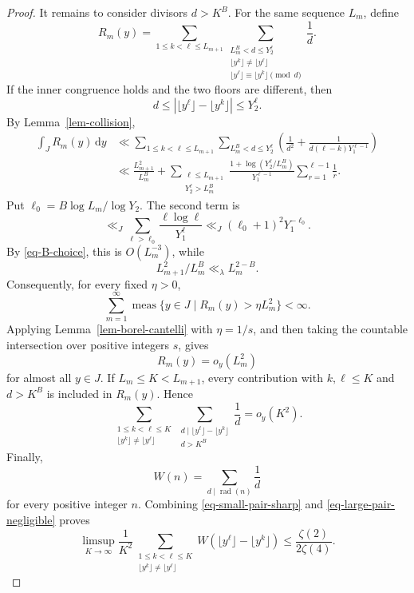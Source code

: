 \documentclass[10pt,a4paper]{amsart}
\begin{document}
\begin{proof}
        It remains to consider divisors $d>K^B$. For the same sequence $L_m$, define
        $$
        R_m(y)=\sum_{1\le k<\ell\le L_{m+1}}
        \sum_{\substack{L_m^B<d\le Y_2^\ell\\
                \lfloor y^k\rfloor\ne\lfloor y^\ell\rfloor\\
                \lfloor y^\ell\rfloor\equiv\lfloor y^k\rfloor\pmod d}}
        \frac1d.
        $$
        If the inner congruence holds and the two floors are different, then
        $$
        d\le \left|\lfloor y^\ell\rfloor-\lfloor y^k\rfloor\right|\le Y_2^\ell.
        $$
        By Lemma~\ref{lem-collision},
        \begin{align*}
            \int_J R_m(y)\,\mathrm{d}y
            &\ll \sum_{1\le k<\ell\le L_{m+1}}
            \sum_{L_m^B<d\le Y_2^\ell}
            \left(\frac1{d^2}+\frac1{d(\ell-k)Y_1^{\ell-1}}\right)\\
            &\ll \frac{L_{m+1}^2}{L_m^B}
            +\sum_{\substack{\ell\le L_{m+1}\\Y_2^\ell>L_m^B}}
            \frac{1+\log(Y_2^\ell/L_m^B)}{Y_1^{\ell-1}}
            \sum_{r=1}^{\ell-1}\frac1r.
        \end{align*}
        Put $\ell_0=B\log L_m/\log Y_2$. The second term is
        $$
        \ll_J \sum_{\ell>\ell_0}\frac{\ell\log \ell}{Y_1^\ell}
        \ll_J (\ell_0+1)^2Y_1^{-\ell_0}.
        $$
        By \eqref{eq-B-choice}, this is $O(L_m^{-3})$, while
        $$
        L_{m+1}^2/L_m^B\ll_\lambda L_m^{2-B}.
        $$
        Consequently, for every fixed $\eta>0$,
        $$
        \sum_{m=1}^{\infty}
        \operatorname{meas}\{y\in J\mid R_m(y)>\eta L_m^2\}<\infty.
        $$
        Applying Lemma~\ref{lem-borel-cantelli} with $\eta=1/s$, and then taking the countable intersection over positive integers $s$, gives
        $$
        R_m(y)=o_y(L_m^2)
        $$
        for almost all $y\in J$. If $L_m\le K<L_{m+1}$, every contribution with $k,\ell\le K$ and $d>K^B$ is included in $R_m(y)$. Hence
        \begin{equation}\label{eq-large-pair-negligible}
            \sum_{\substack{1\le k<\ell\le K\\ \lfloor y^k\rfloor\ne\lfloor y^\ell\rfloor}}
            \sum_{\substack{d\mid \lfloor y^\ell\rfloor-\lfloor y^k\rfloor\\d>K^B}}\frac1d
            =o_y(K^2).
        \end{equation}
        Finally,
        $$
        W(n)=\sum_{d\mid \operatorname{rad}(n)}\frac{1}{d}
        $$
        for every positive integer $n$. Combining \eqref{eq-small-pair-sharp} and \eqref{eq-large-pair-negligible} proves
        \begin{equation}\label{eq-pair-upper}
            \limsup_{K\to\infty}\frac1{K^2}
            \sum_{\substack{1\le k<\ell\le K\\
                    \lfloor y^k\rfloor\ne\lfloor y^\ell\rfloor}}
            W\!\left(\lfloor y^\ell\rfloor-\lfloor y^k\rfloor\right)
            \le \frac{\zeta(2)}{2\zeta(4)}.
        \end{equation}


\end{proof}
\end{document}
